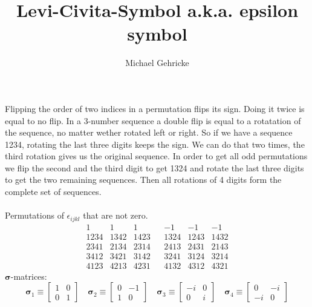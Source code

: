 \documentclass[11pt, oneside]{article}   	%
\title{Levi-Civita-Symbol a.k.a. epsilon symbol}
\author{Michael Gehricke}
\begin{document}
\maketitle
\newcommand{\vect}[1]   {\mathbf{#1}}
\newcommand{\tenmix}[3] {{#1}^{#2}_{#3}}
\newcommand{\omm}[2]    {\bm{\sigma}_{#1}\;\bm{\sigma}_{#2}}
Flipping the order of two indices in a permutation flips its sign. Doing
it twice is equal to no flip. In a 3-number sequence a double flip is equal
to a rotatation of the sequence, no matter wether rotated left or right.
So if we have a sequence 1234, rotating the last three digits keeps the sign.
We can do that two times, the third rotation gives us the original sequence.
In order to get all odd permutations we flip the second and the third digit to
get 1324 and rotate the last three digits to get the two remaining sequences.
Then all rotations of 4 digits form the complete set of sequences.
\\ \\
Permutations of $\epsilon_{ijkl}$ that are not zero.
\begin{equation}
    \begin{matrix}
          1  &   1  &   1  &&  -1  &  -1  &  -1  \\
        1234 & 1342 & 1423 && 1324 & 1243 & 1432 \\
        2341 & 2134 & 2314 && 2413 & 2431 & 2143 \\
        3412 & 3421 & 3142 && 3241 & 3124 & 3214 \\
        4123 & 4213 & 4231 && 4132 & 4312 & 4321
    \end{matrix}
\end{equation}
$\bm{\sigma}$-matrices:
\begin{equation}
\bm{\sigma}_1 \equiv \begin{bmatrix} 1 & 0 \\ 0 & 1 \end{bmatrix} \quad
\bm{\sigma}_2 \equiv \begin{bmatrix} 0 & -1 \\ 1 & 0 \end{bmatrix} \quad 
\bm{\sigma}_3 \equiv \begin{bmatrix} -i & 0 \\ 0 & i \end{bmatrix} \quad
\bm{\sigma}_4 \equiv \begin{bmatrix} 0 & -i \\ -i & 0 \end{bmatrix}
\end{equation} \\
\end{document}
